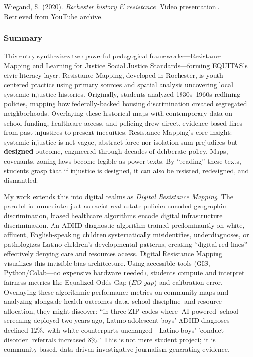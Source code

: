 \documentclass[11pt,twoside]{article}
\DeclareRobustCommand{\EOgap}{EO\text{-}gap\xspace}
\begin{document}
Wiegand, S. (2020). \textit{Rochester history \& resistance} [Video presentation]. Retrieved from YouTube archive.

\vspace{-0.3cm}

\subsubsection*{Summary}

\vspace{-0.3cm}

This entry synthesizes two powerful pedagogical frameworks---Resistance Mapping and Learning for Justice Social Justice Standards---forming EQUITAS's civic-literacy layer. Resistance Mapping, developed in Rochester, is youth-centered practice using primary sources and spatial analysis uncovering local systemic-injustice histories. Originally, students analyzed 1930s--1960s redlining policies, mapping how federally-backed housing discrimination created segregated neighborhoods. Overlaying these historical maps with contemporary data on school funding, healthcare access, and policing drew direct, evidence-based lines from past injustices to present inequities. Resistance Mapping's core insight: systemic injustice is not vague, abstract force nor isolation-sum prejudices but \textbf{designed} outcome, engineered through decades of deliberate policy. Maps, covenants, zoning laws become legible as power texts. By ``reading'' these texts, students grasp that if injustice is designed, it can also be resisted, redesigned, and dismantled.

My work extends this into digital realms as \textit{Digital Resistance Mapping}. The parallel is immediate: just as racist real-estate policies encoded geographic discrimination, biased healthcare algorithms encode digital infrastructure discrimination. An ADHD diagnostic algorithm trained predominantly on white, affluent, English-speaking children systematically misidentifies, underdiagnoses, or pathologizes Latino children's developmental patterns, creating ``digital red lines'' effectively denying care and resources access. Digital Resistance Mapping visualizes this invisible bias architecture. Using accessible tools (GIS, Python/Colab---no expensive hardware needed), students compute and interpret fairness metrics like Equalized-Odds Gap ($\EOgap$) and calibration error. Overlaying these algorithmic performance metrics on community maps and analyzing alongside health-outcomes data, school discipline, and resource allocation, they might discover: ``in three ZIP codes where 'AI-powered' school screening deployed two years ago, Latino adolescent boys' ADHD diagnoses declined 12\%, with white counterparts unchanged---Latino boys' 'conduct disorder' referrals increased 8\%.'' This is not mere student project; it is community-based, data-driven investigative journalism generating evidence.
\end{document}
